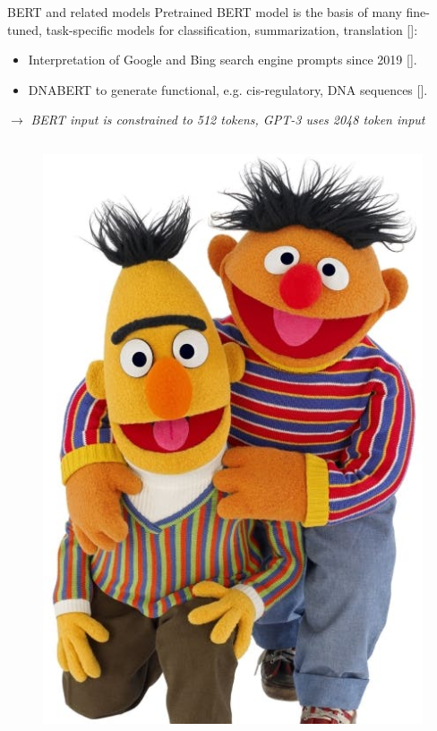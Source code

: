 \documentclass[10pt]{beamer}
\newcommand{\citeme}[1]{{\xspace\color{scAqua} \scriptsize [\cite{#1}]}}
\newcommand{\remark}[1]{{\par \color{scGrape} \ensuremath{\rightarrow} \emph{#1}}}
\begin{document}
\begin{frame}{BERT and related models}
		Pretrained BERT model is the basis of many fine-tuned, task-specific models for classification, summarization, translation\citeme{sun2019finetune}:
		\begin{itemize}
			\item Interpretation of Google and Bing search engine prompts since 2019\citeme{Nayak2019,Zhu2019}.
			\item DNABERT to generate functional, e.g. cis-regulatory, DNA sequences\citeme{Ji2021,Zhou2023}.
		\end{itemize}
		\remark{BERT input is constrained to 512 tokens, GPT-3 uses 2048 token input}
		\begin{columns}[T,onlytextwidth]
			\begin{figure}
				\vspace{0.4cm}
				\includegraphics[height=0.5\textheight]{figures/muppets-ernieandbert.jpg}
			\end{figure}

\end{columns}
\end{frame}
\end{document}
